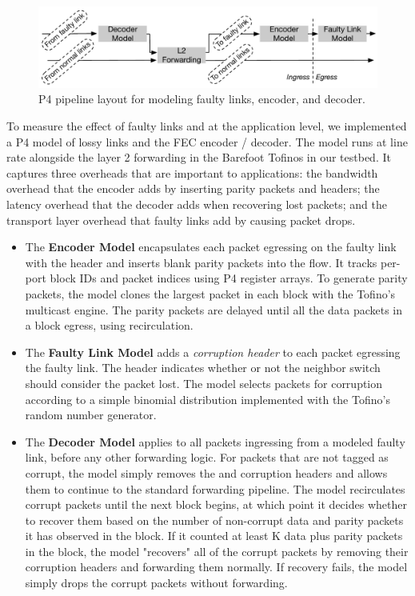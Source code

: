 
\begin{figure}
  \centering
  \includegraphics[width=0.4\paperwidth]{figures/lineRateModel.pdf}
  \caption{\label{fig:lineRateModel} P4 pipeline layout for modeling faulty links, encoder, and decoder.}
\end{figure}

To measure the effect of faulty links and
\OurSys at the application level, we implemented a P4 model of lossy links and
the FEC encoder / decoder. The model runs at line  rate alongside the layer 2
forwarding in the Barefoot Tofinos in our  testbed. It captures three
overheads that are important to applications: the bandwidth overhead that the
encoder adds by inserting parity packets and \OurSys headers; the latency
overhead that the decoder adds when recovering lost packets; and the transport
layer overhead that faulty links add by causing packet drops.

\begin{itemize}

\item The \textbf{Encoder Model} encapsulates each packet  egressing on the
faulty link with the \OurSys header and inserts blank  parity packets into the
flow. It tracks per-port block IDs and  packet indices using P4 register
arrays. To generate parity packets, the  model clones the largest packet in
each block with the Tofino's multicast engine. The parity packets are 
delayed until all the data packets in a block egress, using recirculation. 


\item The \textbf{Faulty Link Model} adds a \emph{corruption header} to each packet
egressing the faulty link. The header indicates whether or not the neighbor
switch should consider the packet lost. The model selects packets for corruption
according to a simple binomial distribution implemented with the Tofino's
random number generator.

\item The \textbf{Decoder Model} applies to all packets ingressing from a
modeled faulty link, before any other forwarding logic. For packets that are
not tagged as corrupt, the model simply removes the \OurSys and corruption headers and
allows them to continue to the standard forwarding  pipeline. The model
recirculates corrupt packets until the next block begins, at which point it
decides whether  to recover them based on the number of non-corrupt data and
parity packets it has  observed in the block.  If it counted at least K data
plus parity packets  in the block, the model "recovers" all of the corrupt
packets by removing their corruption headers and forwarding them normally. If
recovery fails, the model simply drops the corrupt packets without forwarding.

\end{itemize}


